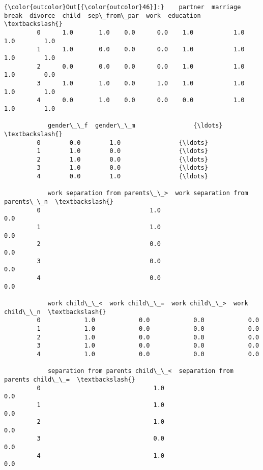 \documentclass[11pt]{article}
\begin{document}
\begin{Verbatim}[commandchars=\\\{\}]
{\color{outcolor}Out[{\color{outcolor}46}]:}    partner  marriage  break  divorce  child  sep\_from\_par  work  education  \textbackslash{}
         0      1.0       1.0    0.0      0.0    1.0           1.0   1.0        1.0   
         1      1.0       0.0    0.0      0.0    1.0           1.0   1.0        1.0   
         2      0.0       0.0    0.0      0.0    1.0           1.0   1.0        0.0   
         3      1.0       1.0    0.0      1.0    1.0           1.0   1.0        1.0   
         4      0.0       1.0    0.0      0.0    0.0           1.0   1.0        1.0   
         
            gender\_\_f  gender\_\_m                {\ldots}                 \textbackslash{}
         0        0.0        1.0                {\ldots}                  
         1        1.0        0.0                {\ldots}                  
         2        1.0        0.0                {\ldots}                  
         3        1.0        0.0                {\ldots}                  
         4        0.0        1.0                {\ldots}                  
         
            work separation from parents\_\_>  work separation from parents\_\_n  \textbackslash{}
         0                              1.0                              0.0   
         1                              1.0                              0.0   
         2                              0.0                              0.0   
         3                              0.0                              0.0   
         4                              0.0                              0.0   
         
            work child\_\_<  work child\_\_=  work child\_\_>  work child\_\_n  \textbackslash{}
         0            1.0            0.0            0.0            0.0   
         1            1.0            0.0            0.0            0.0   
         2            1.0            0.0            0.0            0.0   
         3            1.0            0.0            0.0            0.0   
         4            1.0            0.0            0.0            0.0   
         
            separation from parents child\_\_<  separation from parents child\_\_=  \textbackslash{}
         0                               1.0                               0.0   
         1                               1.0                               0.0   
         2                               1.0                               0.0   
         3                               0.0                               0.0   
         4                               1.0                               0.0   
         

\end{Verbatim}
\end{document}
